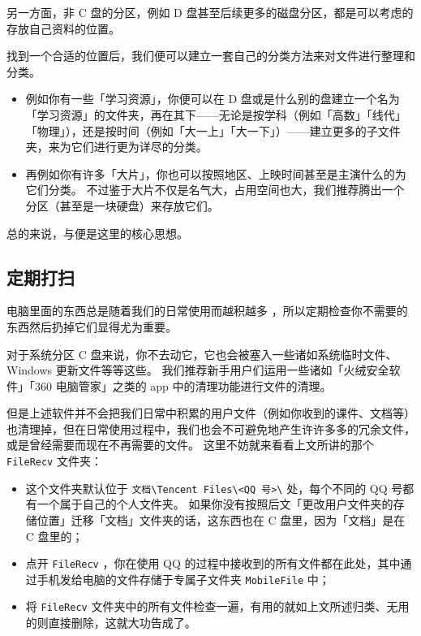 另一方面，非 C 盘的分区，例如 D 盘甚至后续更多的磁盘分区，都是可以考虑的存放自己资料的位置。

找到一个合适的位置后，我们便可以建立一套自己的分类方法来对文件进行整理和分类。


\begin{itemize}
  \item 例如你有一些「学习资源」，你便可以在 D 盘或是什么别的盘建立一个名为「学习资源」的文件夹，再在其下——无论是按学科（例如「高数」「线代」「物理」），还是按时间（例如「大一上」「大一下」）——建立更多的子文件夹，来为它们进行更为详尽的分类。
  \item 再例如你有许多「大片」，你也可以按照地区、上映时间甚至是主演什么的为它们分类。
    不过鉴于大片不仅是名气大，占用空间也大，我们推荐腾出一个分区（甚至是一块硬盘）来存放它们。
\end{itemize}

总的来说，与便是这里的核心思想。

\subsection{定期打扫}

电脑里面的东西总是随着我们的日常使用而越积越多 ，所以定期检查你不需要的东西然后扔掉它们显得尤为重要。

对于系统分区 C 盘来说，你不去动它，它也会被塞入一些诸如系统临时文件、Windows 更新文件等等这些。
我们推荐新手用户们运用一些诸如「火绒安全软件」「360 电脑管家」之类的 app 中的清理功能进行文件的清理。

但是上述软件并不会把我们日常中积累的用户文件（例如你收到的课件、文档等）也清理掉，但在日常使用过程中，我们也会不可避免地产生许许多多的冗余文件，或是曾经需要而现在不再需要的文件。
这里不妨就来看看上文所讲的那个 \verb|FileRecv| 文件夹：

\begin{itemize}
  \item 这个文件夹默认位于 \verb|文档\Tencent Files\<QQ 号>\| 处，每个不同的 QQ 号都有一个属于自己的个人文件夹。
    如果你没有按照后文「更改用户文件夹的存储位置」迁移「文档」文件夹的话，这东西也在 C 盘里，因为「文档」是在 C 盘里的；
  \item 点开 \verb|FileRecv| ，你在使用 QQ 的过程中接收到的所有文件都在此处，其中通过手机发给电脑的文件存储于专属子文件夹 \verb|MobileFile| 中；
  \item 将 \verb|FileRecv| 文件夹中的所有文件检查一遍，有用的就如上文所述归类、无用的则直接删除，这就大功告成了。
\end{itemize}

